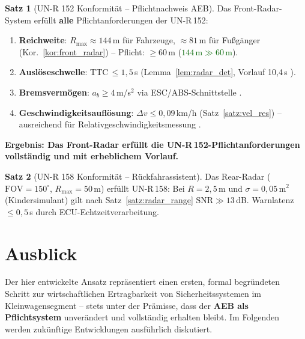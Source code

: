 ﻿\documentclass[a4paper,12pt]{article}
\theoremstyle{definition}
\newtheorem{satz}{Satz}
\begin{document}
\begin{satz}[UN-R 152 Konformit\"at -- Pflichtnachweis AEB]
\label{satz:unr152}
Das Front-Radar-System erf\"ullt \textbf{alle} Pflichtanforderungen
der UN-R\,152:
\begin{enumerate}
  \item \textbf{Reichweite}: $R_{\max}\approx144$\,m f\"ur Fahrzeuge,
        $\approx81$\,m f\"ur Fu\ss{}g\"anger
        (Kor.~\ref{kor:front_radar}) -- Pflicht: $\ge60$\,m
        (\textcolor{darkgreen}{$144\,\text{m} \gg 60\,\text{m}$\;\checkmark}).
  \item \textbf{Ausl\"oseschwelle}: TTC\,$\le1{,}5$\,s
        (Lemma~\ref{lem:radar_det}, Vorlauf 10,4\,s
        \textcolor{darkgreen}{\checkmark}).
  \item \textbf{Bremsverm\"ogen}: $a_b\ge4$\,m/s$^2$ via
        ESC/ABS-Schnittstelle \textcolor{darkgreen}{\checkmark}.
  \item \textbf{Geschwindigkeitsaufl\"osung}: $\Delta v\le0{,}09$\,km/h
        (Satz~\ref{satz:vel_res}) -- ausreichend f\"ur
        Relativgeschwindigkeitsmessung \textcolor{darkgreen}{\checkmark}.
\end{enumerate}
\textcolor{accentred}{\textbf{Ergebnis: Das Front-Radar erf\"ullt die
UN-R\,152-Pflichtanforderungen vollst\"andig und mit erheblichem Vorlauf.}}
\end{satz}

\begin{satz}[UN-R 158 Konformit\"at -- R\"uckfahrassistent]
Das Rear-Radar ($\mathrm{FOV}=150^\circ$, $R_{\max}=50$\,m) erf\"ullt
UN-R\,158: Bei $R=2{,}5$\,m und $\sigma=0{,}05$\,m$^2$ (Kindersimulant)
gilt nach Satz~\ref{satz:radar_range} $\mathrm{SNR}\gg13$\,dB.
Warnlatenz $\le0{,}5$\,s durch ECU-Echtzeitverarbeitung.
\textcolor{darkgreen}{\checkmark}
\end{satz}

\section{Ausblick}
\label{sec:ausblick}

Der hier entwickelte Ansatz repr\"asentiert einen ersten, formal
begr\"undeten Schritt zur wirtschaftlichen Ertragbarkeit von
Sicherheitssystemen im Kleinwagensegment -- stets unter der Pr\"amisse,
dass der \textbf{AEB als Pflichtsystem} unver\"andert und vollst\"andig
erhalten bleibt. Im Folgenden werden zuk\"unftige Entwicklungen
ausf\"uhrlich diskutiert.
\end{document}
